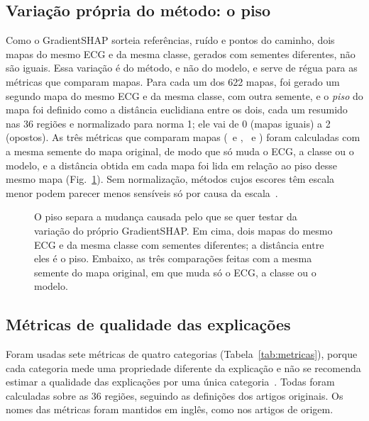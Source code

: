 \subsection{Variação própria do método: o piso}\label{sec:piso}
Como o GradientSHAP sorteia referências, ruído e pontos do caminho, dois mapas do mesmo ECG e da mesma classe, gerados com sementes diferentes, não são iguais. Essa variação é do método, e não do modelo, e serve de régua para as métricas que comparam mapas. Para cada um dos 622 mapas, foi gerado um segundo mapa do mesmo ECG e da mesma classe, com outra semente, e o \emph{piso} do mapa foi definido como a distância euclidiana entre os dois, cada um resumido nas 36 regiões e normalizado para norma 1; ele vai de 0 (mapas iguais) a 2 (opostos). As três métricas que comparam mapas (\MS\ e \AS, \RL\ e \EM) foram calculadas com a mesma semente do mapa original, de modo que só muda o ECG, a classe ou o modelo, e a distância obtida em cada mapa foi lida em relação ao piso desse mesmo mapa (Fig.~\ref{fig:piso}). Sem normalização, métodos cujos escores têm escala menor podem parecer menos sensíveis só por causa da escala~\cite{fouladgar2022}.

\begin{figure}[!t]\centering

\caption{O piso separa a mudança causada pelo que se quer testar da variação do próprio GradientSHAP. Em cima, dois mapas do mesmo ECG e da mesma classe com sementes diferentes; a distância entre eles é o piso. Embaixo, as três comparações feitas com a mesma semente do mapa original, em que muda só o ECG, a classe ou o modelo.}\label{fig:piso}
\end{figure}

\subsection{Métricas de qualidade das explicações}\label{sec:metricas}
Foram usadas sete métricas de quatro categorias (Tabela~\ref{tab:metricas}), porque cada categoria mede uma propriedade diferente da explicação e não se recomenda estimar a qualidade das explicações por uma única categoria~\cite{hedstrom2023metaquantus}. Todas foram calculadas sobre as 36 regiões, seguindo as definições dos artigos originais. Os nomes das métricas foram mantidos em inglês, como nos artigos de origem.

